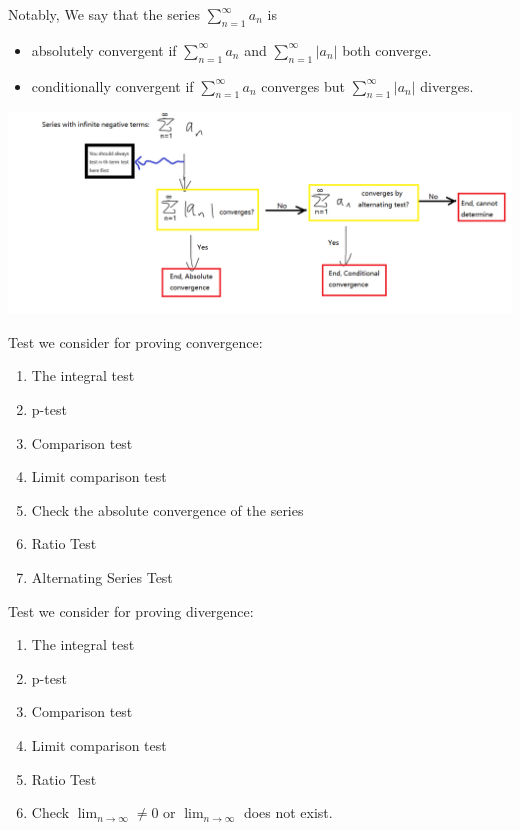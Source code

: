 \documentclass[12pt]{article}
\theoremstyle{definition}
\theoremstyle{definition}
\theoremstyle{remark}
\theoremstyle{definition}
\theoremstyle{definition}
\theoremstyle{definition}
\begin{document}
Notably, We say that the series $\sum_{n=1}^{\infty} a_n$ is
\begin{itemize}
\item absolutely convergent if $\sum_{n=1}^{\infty} a_n$ and $\sum_{n=1}^{\infty}|a_n|$ both converge.
\item conditionally convergent if $\sum_{n=1}^{\infty} a_n$ converges but $\sum_{n=1}^{\infty}|a_n|$ diverges.
\end{itemize}
\includegraphics[width=1\textwidth]{program2.png}


\begin{multicols}{2}
Test we consider for proving convergence:
\begin{enumerate}
	\item The integral test
	\item p-test
	\item Comparison test
	\item Limit comparison test
	\item Check the absolute convergence of the series
	\item Ratio Test
	\item Alternating Series Test
\end{enumerate}
\columnbreak



Test we consider for proving divergence:
\begin{enumerate}
	\item The integral test
	\item p-test
	\item Comparison test
	\item Limit comparison test
	\item Ratio Test
	\item Check $\lim_{n \to \infty} \neq 0$ or $\lim_{n \to \infty}$ does not exist.
\end{enumerate}
\end{multicols}
\end{document}
